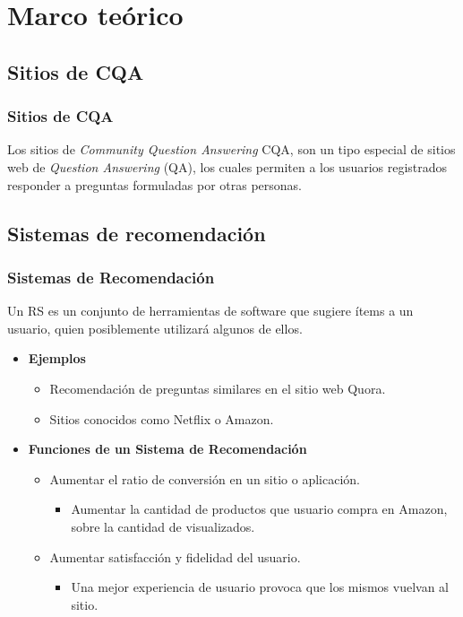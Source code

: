 \section{Marco teórico}
\subsection{Sitios de CQA}
\begin{frame}
	\frametitle{Sitios de CQA}
	\begin{tcolorbox}[colback=blue!5,colframe=blue!40!black,title=Sitios de Community Question Answering]
		Los sitios de \textit{Community Question Answering} CQA, son un tipo especial de sitios web de \textit{Question Answering} (QA), los cuales permiten a los usuarios registrados responder a preguntas formuladas por otras personas.
	\end{tcolorbox}
\end{frame}

\subsection{Sistemas de recomendación}
\begin{frame}
	\frametitle{Sistemas de Recomendación}
	\begin{tcolorbox}[colback=blue!5,colframe=blue!40!black,title=Sistemas de Recomendación]
		Un RS es un conjunto de herramientas de software que sugiere ítems a un usuario, quien posiblemente utilizará algunos de ellos.
	\end{tcolorbox}

	\bigskip
	\begin{itemize}
		\item
		\textbf{Ejemplos}
		\begin{itemize} [<*>]
			\item Recomendación de preguntas similares en el sitio web Quora.
			\item Sitios conocidos como Netflix o Amazon.
		\end{itemize}

		\bigskip

		\item
		\textbf{Funciones de un Sistema de Recomendación}
		\begin{itemize} [<*>]
			\item Aumentar el ratio de conversión en un sitio o aplicación.
			\begin{scriptsize}
				\begin{itemize} [<*>]
					\item Aumentar la cantidad de productos que usuario compra en Amazon, sobre la cantidad de visualizados.
				\end{itemize}
			\end{scriptsize}
			\item Aumentar satisfacción y fidelidad del usuario.
			\begin{itemize} [<*>]
				\item Una mejor experiencia de usuario provoca que los mismos vuelvan al sitio.
			\end{itemize}
		\end{itemize}
	\end{itemize}
\end{frame}

